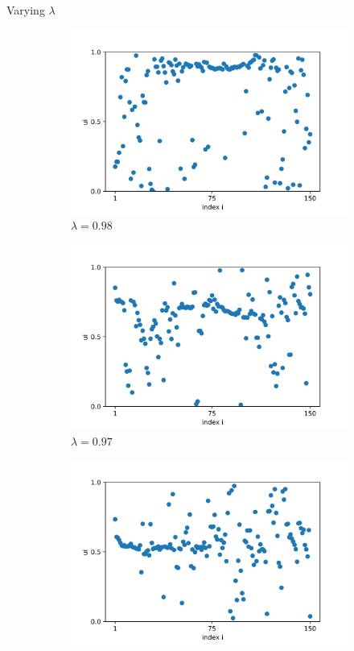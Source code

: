\documentclass{beamer}
\begin{document}
\begin{frame}{Varying $\lambda$}
\begin{figure}[H]
\begin{subfigure}{.32\textwidth}
  \includegraphics[width=1\linewidth]{u_lambda=0.98_t=2000}  
  \caption{$\lambda=0.98$}
\end{subfigure}
\begin{subfigure}{.32\textwidth}
  \centering
  \includegraphics[width=1\linewidth]{u_lambda=0.97_t=2000.png}  
  \caption{$\lambda=0.97$}
\end{subfigure}
\hfill
\begin{subfigure}{.32\textwidth}
  \centering
  \includegraphics[width=1\linewidth]{u_lambda=0.96_t=2000.png}  

\end{subfigure}
\end{figure}
\end{frame}
\end{document}

